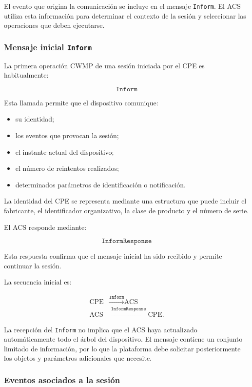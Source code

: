 El evento que origina la comunicación se incluye en el mensaje
\texttt{Inform}. El ACS utiliza esta información para determinar el
contexto de la sesión y seleccionar las operaciones que deben ejecutarse.


\subsubsection*{Mensaje inicial \texttt{Inform}}

La primera operación CWMP de una sesión iniciada por el CPE es
habitualmente:

\[
    \texttt{Inform}
\]

Esta llamada permite que el dispositivo comunique:

\begin{itemize}
    \item su identidad;
    \item los eventos que provocan la sesión;
    \item el instante actual del dispositivo;
    \item el número de reintentos realizados;
    \item determinados parámetros de identificación o notificación.
\end{itemize}

La identidad del CPE se representa mediante una estructura que puede
incluir el fabricante, el identificador organizativo, la clase de
producto y el número de serie.

El ACS responde mediante:

\[
    \texttt{InformResponse}
\]

Esta respuesta confirma que el mensaje inicial ha sido recibido y permite
continuar la sesión.

La secuencia inicial es:

\[
\begin{aligned}
    \text{CPE}
    &\xrightarrow{\texttt{Inform}}
    \text{ACS}\\
    \text{ACS}
    &\xrightarrow{\texttt{InformResponse}}
    \text{CPE}.
\end{aligned}
\]

La recepción del \texttt{Inform} no implica que el ACS haya actualizado
automáticamente todo el árbol del dispositivo. El mensaje contiene un
conjunto limitado de información, por lo que la plataforma debe solicitar
posteriormente los objetos y parámetros adicionales que necesite.


\subsubsection*{Eventos asociados a la sesión}

